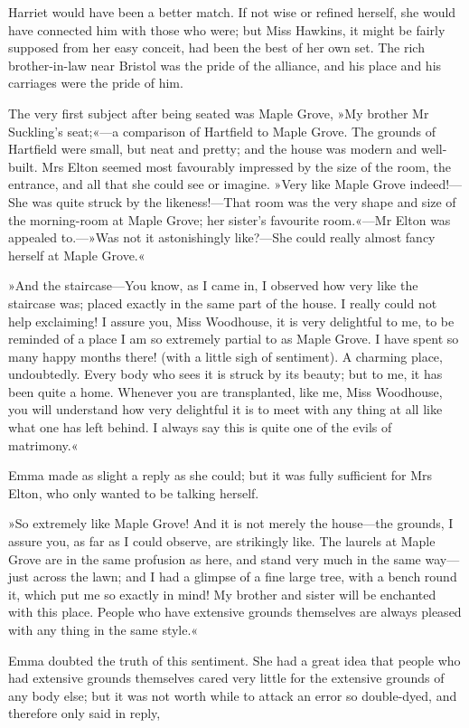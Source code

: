 Harriet would have been a better match. If not wise or refined herself, she would have connected him with those who were; but Miss Hawkins, it might be fairly supposed from her easy conceit, had been the best of her own set. The rich brother-in-law near Bristol was the pride of the alliance, and his place and his carriages were the pride of him.

The very first subject after being seated was Maple Grove, »My brother Mr Suckling's seat;«—a comparison of Hartfield to Maple Grove. The grounds of Hartfield were small, but neat and pretty; and the house was modern and well-built. Mrs Elton seemed most favourably impressed by the size of the room, the entrance, and all that she could see or imagine. »Very like Maple Grove indeed!—She was quite struck by the likeness!—That room was the very shape and size of the morning-room at Maple Grove; her sister's favourite room.«—Mr Elton was appealed to.—»Was not it astonishingly like?—She could really almost fancy herself at Maple Grove.«

»And the staircase—You know, as I came in, I observed how very like the staircase was; placed exactly in the same part of the house. I really could not help exclaiming! I assure you, Miss Woodhouse, it is very delightful to me, to be reminded of a place I am so extremely partial to as Maple Grove. I have spent so many happy months there! (with a little sigh of sentiment). A charming place, undoubtedly. Every body who sees it is struck by its beauty; but to me, it has been quite a home. Whenever you are transplanted, like me, Miss Woodhouse, you will understand how very delightful it is to meet with any thing at all like what one has left behind. I always say this is quite one of the evils of matrimony.«

Emma made as slight a reply as she could; but it was fully sufficient for Mrs Elton, who only wanted to be talking herself.

»So extremely like Maple Grove! And it is not merely the house—the grounds, I assure you, as far as I could observe, are strikingly like. The laurels at Maple Grove are in the same profusion as here, and stand very much in the same way—just across the lawn; and I had a glimpse of a fine large tree, with a bench round it, which put me so exactly in mind! My brother and sister will be enchanted with this place. People who have extensive grounds themselves are always pleased with any thing in the same style.«

Emma doubted the truth of this sentiment. She had a great idea that people who had extensive grounds themselves cared very little for the extensive grounds of any body else; but it was not worth while to attack an error so double-dyed, and therefore only said in reply,

